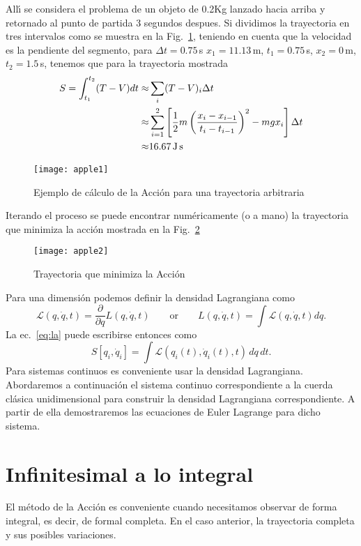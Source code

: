 All\'\i{} se considera el problema de un objeto de 0.2Kg lanzado hacia arriba y retornado al punto de partida 3 segundos despues. Si dividimos la trayectoria en tres intervalos como se muestra en la Fig.~\ref{fig:apple1}, teniendo en cuenta que la velocidad es la pendiente del segmento, para $\Delta t=0.75\,$s $x_1=11.13\,$m, $t_1=0.75\,$s, $x_2=0\,$m, $t_2=1.5\,$s, tenemos que para la trayectoria mostrada
\begin{align}
  S=\int_{t_1}^{t_2}(T-V)dt\approx&\sum_i(T-V)_i\Delta t\nonumber\\
  \approx&\sum_{i=1}^2\left[\frac{1}{2}m\left(\frac{x_i-x_{i-1}}{t_i-t_{i-1}}\right)^2-m g x_i\right]\Delta t\nonumber\\
  \approx&16.67\,\text{J\,s}
\end{align}
\begin{figure}
  \centering
  \texttt{[image: apple1]}
  \caption{Ejemplo de c\'alculo de la Acci\'on para una trayectoria arbitraria}
  \label{fig:apple1}
\end{figure}
Iterando el proceso se puede encontrar num\'ericamente (o a mano) la trayectoria que minimiza la acci\'on mostrada en la Fig.~\ref{fig:apple2}
\begin{figure}
  \centering
\texttt{[image: apple2]}
  \caption{Trayectoria que minimiza la Acci\'on}
\label{fig:apple2}
\end{figure}
Para una dimensi\'on podemos definir la densidad Lagrangiana como
\begin{equation}
  \mathcal{L}(q,\dot q,t)=\frac{\partial}{\partial q}L(q,\dot q,t)\qquad\text{or}\qquad L(q,\dot q,t)=\int\mathcal{L}(q,\dot q,t)dq.
\end{equation}
La ec.~\eqref{eq:la} puede escribirse entonces como
\begin{equation}
   S\left[q_i,\dot{q}_i\right] = \int \mathcal{L}(q_i(t), \dot{q}_i(t),t)\, dq\,dt.
\end{equation}
Para sistemas continuos es conveniente usar la densidad Lagrangiana. Abordaremos a continuaci\'on el sistema continuo correspondiente a la cuerda cl\'asica unidimensional para construir la densidad Lagrangiana correspondiente. A partir de ella demostraremos las ecuaciones de Euler Lagrange para dicho sistema.


\section{Infinitesimal a lo integral}
El método de la Acción es conveniente cuando necesitamos observar de forma integral, es decir, de formal completa. En el caso anterior, la trayectoria completa y sus posibles variaciones.


